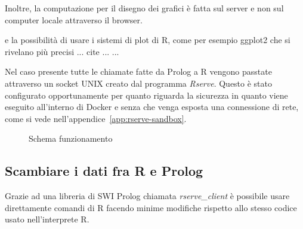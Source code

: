 \documentclass[10pt,titlepage,twoside,a4paper]{report}
\begin{document}
Inoltre, la computazione per il disegno dei grafici è fatta sul server e non 
sul computer locale attraverso il browser.
 
e la possibilità di usare i sistemi di plot di R, come per esempio ggplot2 
che si rivelano più precisi ... cite ... ...

Nel caso presente tutte le chiamate fatte da Prolog a R vengono passtate 
attraverso un socket UNIX creato dal programma \emph{Rserve}\cite{rserve}. 
Questo è stato configurato opportunamente per quanto riguarda la sicurezza 
in quanto viene eseguito all'interno di Docker e senza che venga esposta una 
connessione di rete, come si vede nell'appendice~\ref{app:rserve-sandbox}.

\begin{figure}[H]
\centering
\caption{Schema funzionamento}
\end{figure}

\subsection{Scambiare i dati fra R e Prolog}
Grazie ad una libreria di SWI Prolog chiamata 
\emph{rserve\_client}\cite{rserveclient} 
è possibile usare direttamente comandi di R facendo minime modifiche 
rispetto allo stesso codice usato nell'interprete R.
\end{document}
